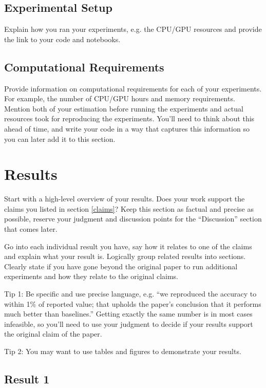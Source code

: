 \documentclass{article}
\begin{document}
\subsection{Experimental Setup}
Explain how you ran your experiments, e.g. the CPU/GPU resources and provide the link to your code and notebooks. 

\subsection{Computational Requirements}
Provide information on computational requirements for each of your experiments. For example, the number of CPU/GPU hours and memory requirements.
Mention both of your estimation before running the experiments and actual resources took for reproducing the experiments. 
You'll need to think about this ahead of time, and write your code in a way that captures this information so you can later add it to this section. 

\section{Results}
Start with a high-level overview of your results. Does your work support the claims you listed in section \ref{claims}? Keep this section as factual and precise as possible, reserve your judgment and discussion points for the ``Discussion'' section that comes later. 

Go into each individual result you have, say how it relates to one of the claims and explain what your result is. Logically group related results into sections. Clearly state if you have gone beyond the original paper to run additional experiments and how they relate to the original claims. 

Tip 1: Be specific and use precise language, e.g. ``we reproduced the accuracy to within 1\% of reported value; that upholds the paper's conclusion that it performs much better than baselines.'' Getting exactly the same number is in most cases infeasible, so you'll need to use your judgment to decide if your results support the original claim of the paper. 

Tip 2: You may want to use tables and figures to demonstrate your results.


\subsection{Result 1}
\end{document}
